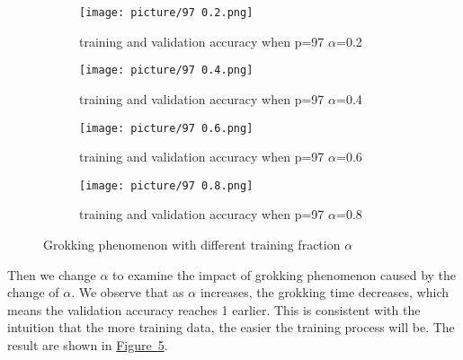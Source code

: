 \documentclass{article}
\begin{document}
\begin{figure}[htbp]
  \centering
   \begin{subfigure}[b]{0.22\textwidth}
        \centering
    \texttt{[image: picture/97 0.2.png]}
    \caption{training and validation accuracy when p=97 $\alpha$=0.2}
    \label{fig2:sub1}
  \end{subfigure}
  \hspace{0.5em} %
     \begin{subfigure}[b]{0.22\textwidth}
        \centering
    \texttt{[image: picture/97 0.4.png]}
    \caption{training and validation accuracy when p=97 $\alpha$=0.4}
    \label{fig2:sub2}
  \end{subfigure}
  \hspace{0.5em} %
     \begin{subfigure}[b]{0.22\textwidth}
        \centering
    \texttt{[image: picture/97 0.6.png]}
    \caption{training and validation accuracy when p=97 $\alpha$=0.6}
    \label{fig2:sub3}
  \end{subfigure}
  \hspace{0.5em} %
    \begin{subfigure}[b]{0.22\textwidth}
        \centering
    \texttt{[image: picture/97 0.8.png]}
    \caption{training and validation accuracy when p=97 $\alpha$=0.8}
    \label{fig2:sub4}
  \end{subfigure}
  
  \renewcommand{\figurename}{Figure}
  \caption{Grokking phenomenon with different training fraction $\alpha$}
  \label{fig2:main}
\end{figure}

\vspace{-0.5em}

Then we change $\alpha$ to examine the impact of grokking phenomenon caused by the change of $\alpha$. We observe that as $\alpha$ increases, the grokking time decreases, which means the validation accuracy reaches 1 earlier. This is consistent with the intuition that the more training data, the easier the training process will be. The result are shown in \hyperref[fig2:main]{Figure~\ref{fig2:main}}.

\vspace{-1em}
\end{document}
